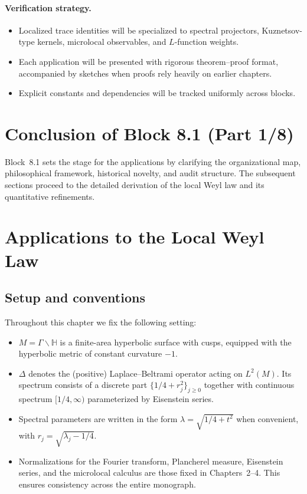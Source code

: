 \paragraph{Verification strategy.}
\begin{itemize}
\item Localized trace identities will be specialized to spectral projectors, Kuznetsov-type kernels, microlocal observables, and $L$-function weights.  
\item Each application will be presented with rigorous theorem–proof format, accompanied by sketches when proofs rely heavily on earlier chapters.  
\item Explicit constants and dependencies will be tracked uniformly across blocks.  
\end{itemize}

\section{Conclusion of Block 8.1 (Part 1/8)}

Block~8.1 sets the stage for the applications by clarifying the organizational map, philosophical framework, historical novelty, and audit structure. The subsequent sections proceed to the detailed derivation of the local Weyl law and its quantitative refinements.


\section{Applications to the Local Weyl Law}\label{sec:apps-weyl}

\subsection{Setup and conventions}

Throughout this chapter we fix the following setting:

\begin{itemize}
\item $M=\Gamma\backslash\mathbb{H}$ is a finite-area hyperbolic surface with cusps, equipped with the hyperbolic metric of constant curvature $-1$.
\item $\Delta$ denotes the (positive) Laplace--Beltrami operator acting on $L^2(M)$. Its spectrum consists of a discrete part $\{1/4+r_j^2\}_{j\ge 0}$ together with continuous spectrum $[1/4,\infty)$ parameterized by Eisenstein series.
\item Spectral parameters are written in the form $\lambda = \sqrt{1/4+t^2}$ when convenient, with $r_j=\sqrt{\lambda_j-1/4}$.
\item Normalizations for the Fourier transform, Plancherel measure, Eisenstein series, and the microlocal calculus are those fixed in Chapters~2--4. This ensures consistency across the entire monograph.
\end{itemize}

